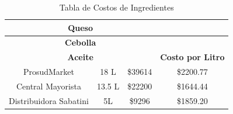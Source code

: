 \documentclass[12pt]{article}
\begin{document}
\begin{table}[h!]
\begin{tabular}{|| c | c | c | c||}
        \multicolumn{3}{||c|}{\textbf{Queso}} & \\ [0.5ex] \hline \hline %
        \multicolumn{3}{||c|}{\textbf{Cebolla}} & \\ [0.5ex] \hline \hline %

        \multicolumn{3}{||c|}{\textbf{Aceite}} & \textbf{Costo por Litro} \\ [0.5ex] \hline \hline
        ProsudMarket & 18 L & \$39614 & \$2200.77 \\ \hline
        Central Mayorista & 13.5 L & \$22200 & \$1644.44 \\ \hline
        Distribuidora Sabatini & 5L & \$9296 & \$1859.20 \\ [1ex] \hline \hline

    \end{tabular}
    \caption{Tabla de Costos de Ingredientes}
    \label{tab:costos_ingredientes}
\end{table}
\end{document}
